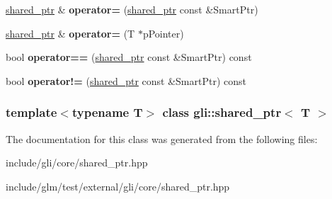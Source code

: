 \begin{DoxyCompactItemize}
\item 
\hypertarget{classgli_1_1shared__ptr_ae07dfaf8ed2262c0f14a16c647f5e238}{\hyperlink{classgli_1_1shared__ptr}{shared\-\_\-ptr} \& {\bfseries operator=} (\hyperlink{classgli_1_1shared__ptr}{shared\-\_\-ptr} const \&\-Smart\-Ptr)}\label{classgli_1_1shared__ptr_ae07dfaf8ed2262c0f14a16c647f5e238}

\item 
\hypertarget{classgli_1_1shared__ptr_a560d99b0949454bd569d4ae1e5769b3b}{\hyperlink{classgli_1_1shared__ptr}{shared\-\_\-ptr} \& {\bfseries operator=} (\-T $\ast$p\-Pointer)}\label{classgli_1_1shared__ptr_a560d99b0949454bd569d4ae1e5769b3b}

\item 
\hypertarget{classgli_1_1shared__ptr_a0fbab40d4b8c0fc6fd44cf97b7f4abe8}{bool {\bfseries operator==} (\hyperlink{classgli_1_1shared__ptr}{shared\-\_\-ptr} const \&\-Smart\-Ptr) const }\label{classgli_1_1shared__ptr_a0fbab40d4b8c0fc6fd44cf97b7f4abe8}

\item 
\hypertarget{classgli_1_1shared__ptr_a45fd1926de7178c7d66b6f2591723bd4}{bool {\bfseries operator!=} (\hyperlink{classgli_1_1shared__ptr}{shared\-\_\-ptr} const \&\-Smart\-Ptr) const }\label{classgli_1_1shared__ptr_a45fd1926de7178c7d66b6f2591723bd4}

\end{DoxyCompactItemize}
\subsubsection*{template$<$typename T$>$ class gli\-::shared\-\_\-ptr$<$ T $>$}



\-The documentation for this class was generated from the following files\-:\begin{DoxyCompactItemize}
\item 
include/gli/core/shared\-\_\-ptr.\-hpp\item 
include/glm/test/external/gli/core/shared\-\_\-ptr.\-hpp\end{DoxyCompactItemize}
